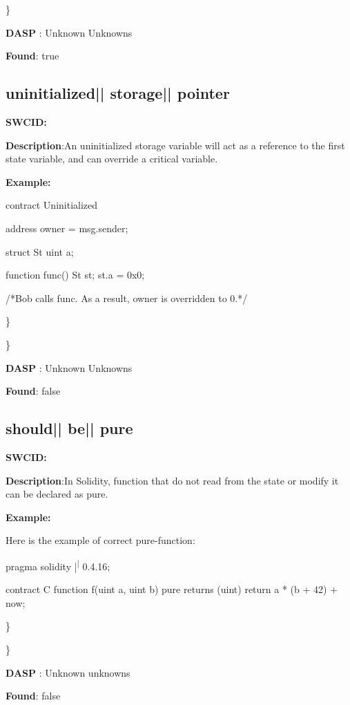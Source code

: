 \documentclass{article}
\begin{document}
\} 

\textbf{DASP} : Unknown Unknowns

\textbf{Found}: true

\subsection{uninitialized{|\textunderscore| }storage{|\textunderscore| }pointer} 
\textbf{SWC{\textunderscore }ID:} 

\textbf{Description}:An uninitialized storage variable will act as a reference to the first state variable, and can override a critical variable.


\textbf{Example:} 
\begin{ffcode} 

contract Uninitialized{
    address owner = msg.sender;

    struct St{
        uint a;
    }

    function func() {
        St st;
        st.a = 0x0;
    }
}
 /*Bob calls func. As a result, owner is overridden to 0.*/ 

\end{ffcode} 
\} 

\} 

\textbf{DASP} : Unknown Unknowns

\textbf{Found}: false

\subsection{should{|\textunderscore| }be{|\textunderscore| }pure} 
\textbf{SWC{\textunderscore }ID:} 

\textbf{Description}:In Solidity, function that do not read from the state or modify it can be declared as pure.


\textbf{Example:} 
\begin{ffcode} 

Here is the example of correct pure-function:

pragma solidity |\textsuperscript| 0.4.16;

contract C {
    function f(uint a, uint b) pure returns (uint) {
        return a * (b + 42) + now;
    }
}

\end{ffcode} 
\} 

\} 

\textbf{DASP} : Unknown unknowns

\textbf{Found}: false
\end{document}
